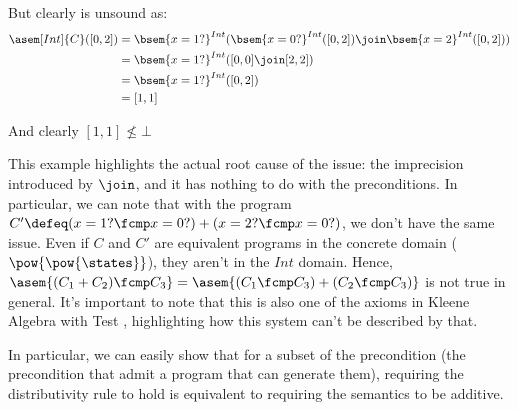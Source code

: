 \begin{example}
  But clearly is unsound as:
  \begin{align*}
    \asem[Int]{C}([0, 2]) &= \bsem{x = 1?}^{Int}(\bsem{x = 0?}^{Int}([0, 2]) 
      \join \bsem{x = 2}^{Int}([0, 2])) \\
                          &= \bsem{x = 1?}^{Int}([0, 0] \join [2, 2]) \\
                          &= \bsem{x = 1?}^{Int}([0, 2]) \\
                          &= [1, 1]
  \end{align*}

  And clearly $[1, 1] \not \leq \bot$
\end{example}

This example highlights the actual root cause of the issue: the imprecision
introduced by $\join$, and it has nothing to do with the preconditions. In
particular, we can note that with the program $C' \defeq (x = 1? \fcmp x = 0?)
+ (x = 2? \fcmp x = 0?)$, we don't have the same issue. Even if $C$ and $C'$
are equivalent programs in the concrete domain ($\pow{\pow{\states}}$), they
aren't in the $Int$ domain. Hence, $\asem{(C_1 + C_2) \fcmp C_3} = \asem{(C_1
\fcmp C_3) + (C_2 \fcmp C_3)}$ is not true in general. It's important to note
that this is also one of the axioms in Kleene Algebra with Test \cite{Kozen97},
highlighting how this system can't be described by that.

In particular, we can easily show that for a subset of the precondition (the
precondition that admit a program that can generate them), requiring the
distributivity rule to hold is equivalent to requiring the semantics to be
additive.

